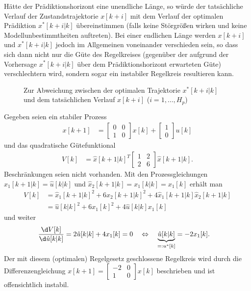Hätte der Prädiktionshorizont eine unendliche Länge, so würde der tatsächliche Verlauf der Zustandstrajektorie $x[k+i]$ mit dem Verlauf der optimalen Prädiktion $x^{\ast}[k+i|k]$
übereinstimmen (falls keine Störgrößen wirken und keine Modellunbestimmtheiten auftreten). Bei einer endlichen Länge werden $x[k+i]$ und $x^{\ast}[k+i|k]$ jedoch im Allgemeinen
voneinander verschieden sein, so dass sich dann nicht nur die Güte des Regelkreises (gegenüber der aufgrund der Vorhersage $x^{\ast}[k+i|k]$ über dem Prädiktionshorizont erwarteten
Güte) verschlechtern wird, sondern sogar ein instabiler Regelkreis resultieren kann.
\begin{figure}[htb]
	\centering
	
	\caption{Zur Abweichung zwischen der optimalen Trajektorie $x^{\ast}[k+i|k]$ und dem tatsächlichen Verlauf $x[k+i]$ ($i=1,\ldots,H_p$)}
	\label{fig:kap_4_abweichung_opt_tatsaechlich_verlauf}
\end{figure}
\begin{exmp}
Gegeben seien ein stabiler Prozess
\begin{align*}
	x[k+1] & = \begin{bmatrix}
	0 & 0\\ 1 & 0
	\end{bmatrix}x[k]+\begin{bmatrix}
	1\\ 0
	\end{bmatrix}u[k]
\end{align*}
und das quadratische Gütefunktional
\begin{align*}
	V[k] & = \hat{x}[k+1|k]^T\begin{bmatrix}
	1 & 2\\ 2& 6
	\end{bmatrix}\hat{x}[k+1|k].
\end{align*}
Beschränkungen seien nicht vorhanden. Mit den Prozessgleichungen $\hat{x}_1[k+1|k]=\hat{u}[k|k]$ und $\hat{x}_2[k+1|k]=x_1[k|k]=x_1[k]$ erhält man
\begin{align*}
	V[k] & = \hat{x}_1[k+1|k]^2+6\hat{x}_2[k+1|k]^2+4\hat{x}_1[k+1|k]\hat{x}_2[k+1|k]\\
		 & = \hat{u}[k|k]^2+6x_1[k]^2+4\hat{u}[k|k]x_1[k]
\end{align*}
und weiter
\begin{align*}
\frac{\d V[k]}{\d\hat{u}[k|k]} & = 2\hat{u}[k|k]+4 x_1[k]=0\quad \Leftrightarrow\quad \underbrace{\hat{u}[k|k]}_{=:u^{\ast}[k]}=-2x_1[k].
\end{align*}
Der mit diesem (optimalen) Regelgesetz geschlossene Regelkreis wird durch die Differenzengleichung $x[k+1]=\begin{bmatrix}-2 & 0\\ 1 & 0 \end{bmatrix}x[k]$ beschrieben und ist
offensichtlich instabil.
\end{exmp}


